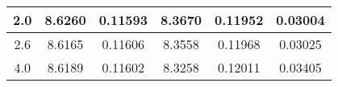 \documentclass[preprint,showpacs,preprintnumbers,amsmath,amssymb, prb]{revtex4}
\begin{document}
\begin{table}[]
\begin{tabular}{c|c|c|c|c|c}
2.0                                                          & 8.6260                                                                                   & 0.11593                                                                                                       & 8.3670                                                                                   & 0.11952                                                                                                       & 0.03004                                                \\ \hline
2.6                                                          & 8.6165                                                                                   & 0.11606                                                                                                       & 8.3558                                                                                   & 0.11968                                                                                                       & 0.03025                                                \\ \hline
4.0                                                          & 8.6189                                                                                   & 0.11602                                                                                                       & 8.3258                                                                                   & 0.12011                                                                                                       & 0.03405                                                \\ \hline
\end{tabular}
\end{table}
%
\end{document}
